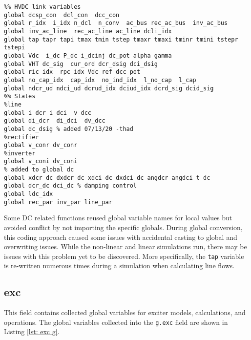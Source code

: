 \begin{lstlisting}[caption={DC Global Field Variables},label={lst: dc g}]
\end{lstlisting}\vspace{-2 em}
\begin{verbatim}
%% HVDC link variables 
global dcsp_con  dcl_con  dcc_con
global r_idx  i_idx n_dcl  n_conv  ac_bus rec_ac_bus  inv_ac_bus
global inv_ac_line  rec_ac_line ac_line dcli_idx
global tap tapr tapi tmax tmin tstep tmaxr tmaxi tminr tmini tstepr tstepi
global Vdc  i_dc P_dc i_dcinj dc_pot alpha gamma 
global VHT dc_sig  cur_ord dcr_dsig dci_dsig
global ric_idx  rpc_idx Vdc_ref dcc_pot
global no_cap_idx  cap_idx  no_ind_idx  l_no_cap  l_cap
global ndcr_ud ndci_ud dcrud_idx dciud_idx dcrd_sig dcid_sig
%% States
%line
global i_dcr i_dci  v_dcc
global di_dcr  di_dci  dv_dcc
global dc_dsig % added 07/13/20 -thad
%rectifier
global v_conr dv_conr
%inverter
global v_coni dv_coni
% added to global dc
global xdcr_dc dxdcr_dc xdci_dc dxdci_dc angdcr angdci t_dc
global dcr_dc dci_dc % damping control
global ldc_idx
global rec_par inv_par line_par
\end{verbatim}

Some DC related functions reused global variable names for local values but avoided conflict by not importing the specific globals.
During global conversion, this coding approach caused some issues with accidental casting to global and overwriting issues.
While the non-linear and linear simulations run, there may be issues with this problem yet to be discovered.
More specifically, the \verb|tap| variable is re-written numerous times during a simulation when calculating line flows.


\pagebreak
\subsection{exc}
This field contains collected global variables for exciter models, calculations, and operations.
The global variables collected into the \verb|g.exc| field are shown in Listing \ref{lst: exc g}.

